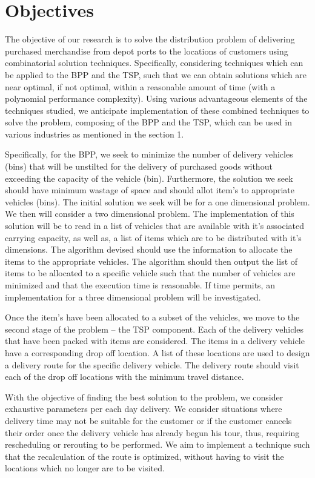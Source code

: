 \newpage
\section{Objectives}
The objective of our research is to solve the distribution problem of delivering purchased merchandise from depot ports to the locations of customers using combinatorial solution techniques. Specifically, considering techniques which can be applied to the BPP and the TSP, such that we can obtain solutions which are near optimal, if not optimal, within a reasonable amount of time (with a polynomial performance complexity). Using various advantageous elements of the techniques studied, we anticipate implementation of these combined techniques to solve the problem, composing of the BPP and the TSP, which can be used in various industries as mentioned in the section 1. 

Specifically, for the BPP, we seek to minimize the number of delivery vehicles (bins) that will be unstilted for the delivery of purchased goods without exceeding the capacity of the vehicle (bin). Furthermore, the solution we seek should have minimum wastage of space and should allot item's to appropriate vehicles (bins). The initial solution we seek will be for a one dimensional problem. We then will consider a two dimensional problem. The implementation of this solution will be to read in a list of vehicles that are available with it's associated carrying capacity, as well as, a list of items which are to be distributed with it's dimensions. The algorithm devised should use the information to allocate the items to the appropriate vehicles. The algorithm should then output the list of items to be allocated to a specific vehicle such that the number of vehicles are minimized and that the execution time is reasonable.  If time permits, an implementation for a three dimensional problem will be investigated. 

Once the item's have been allocated to a subset of the vehicles, we move to the second stage of the problem – the TSP component. Each of the delivery vehicles that have been packed with items are considered. The items in a delivery vehicle have a corresponding drop off location. A list of these locations are used to design a delivery route for the specific delivery vehicle. The delivery route should visit each of the drop off locations with the minimum travel distance.

With the objective of finding the best solution to the problem, we consider exhaustive parameters per each day delivery. We consider situations where delivery time may not be suitable for the customer or if the customer cancels their order once the delivery vehicle has already begun his tour, thus, requiring rescheduling or rerouting to be performed. We aim to implement a technique such that the recalculation of the route is optimized, without having to visit the locations which no longer are to be visited. 

